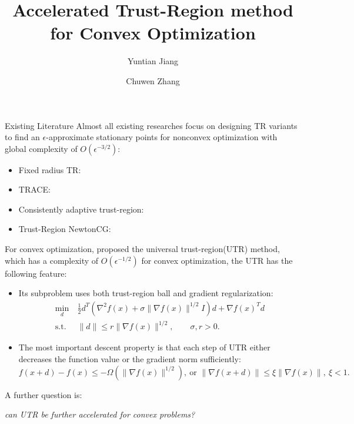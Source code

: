 \documentclass[10pt, notheorems, envcountsect]{beamer}
\title{Accelerated Trust-Region method for Convex Optimization}
\author{Yuntian Jiang \and Chuwen Zhang}
\theoremstyle{plain}
\begin{document}
  {%
    \frame{\titlepage}
  }

\footnotesize
\begin{frame}[allowframebreaks]{Existing Literature}
Almost all existing researches focus on designing TR variants to find an $\epsilon$-approximate stationary points for nonconvex optimization with global complexity of $O(\epsilon^{-3/2})$:
\begin{itemize}
    \item Fixed radius TR:~\citet{luenberger_linear_2021}
    \item TRACE:~\citet{curtis2017trust}
    \item Consistently adaptive trust-region:~\citet{hamad2022consistently,hamad2024simplepracticaladaptivetrustregion}
    \item Trust-Region NewtonCG:~\citet{curtis2021trust}
\end{itemize}
\framebreak
For convex optimization, \citet{jiang2024nonconvexityuniversaltrustregionmethod} proposed the universal trust-region(UTR) method, which has a complexity of $O(\epsilon^{-1/2})$ for convex optimization, the UTR has the following feature:
\begin{itemize}
    \item Its subproblem uses both trust-region ball and gradient regularization:
    \begin{equation}\label{eq.newTR}
    \begin{split}
        \min_d ~&  \frac{1}{2}d^T\left (\nabla^2 f(x) + \sigma \|\nabla f(x)\|^{1/2} I \right ) d + \nabla f(x)^T d\\
        \text{s.t. } ~& \|d\| \le r\|\nabla f(x)\|^{1/2}, \qquad \sigma, r > 0.
    \end{split}
\end{equation}
    \item The most important descent property is that each step of UTR either decreases the function value or the gradient norm sufficiently:
    \begin{equation}
        \label{eq.FOSD}
        f(x+d) - f(x) \leq -\Omega(\|\nabla f(x)\|^{1/2}), \ \text{or } \|\nabla f(x+d)\|\leq \xi \|\nabla f(x)\|, \ \xi<1.
    \end{equation}
\end{itemize}
A further question is: 
\begin{center}
\textit{can UTR be further accelerated for convex problems?}
\end{center}
\end{frame}
\end{document}
